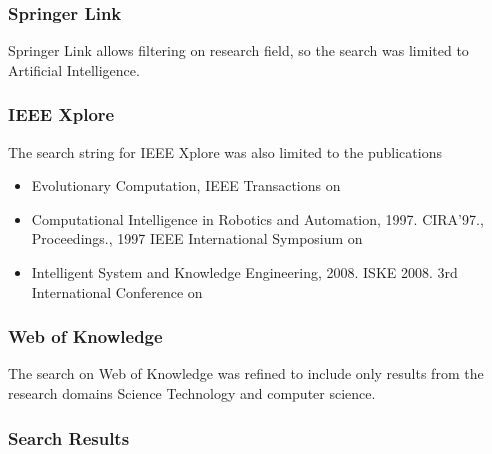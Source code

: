 \documentclass[a4paper]{book}
\begin{document}
				\subsubsection{Springer Link}Springer Link allows filtering on research field, so the search was limited to Artificial Intelligence.


				\subsubsection{IEEE Xplore}
				The search string for IEEE Xplore was also limited to the publications

				\begin{itemize}
				\item{ Evolutionary Computation, IEEE Transactions on}
				\item{Computational Intelligence in Robotics and Automation, 1997. CIRA'97., Proceedings., 1997 IEEE International Symposium on}
				\item{Intelligent System and Knowledge Engineering, 2008. ISKE 2008. 3rd International Conference on}
				\end{itemize}

				\subsubsection{Web of Knowledge} The search on Web of Knowledge was refined to include only results from the research domains Science Technology and computer science.

				\subsubsection{Search Results}
\end{document}
